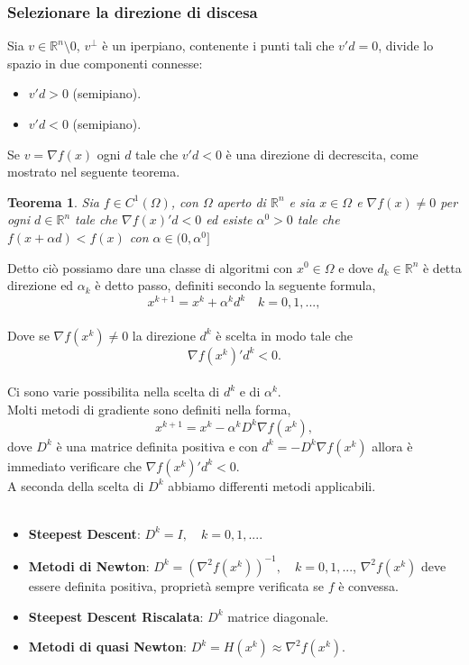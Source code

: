 \documentclass[a4paper, 12pt]{article}
\newtheorem{theorem}{Teorema}
\begin{document}
\subsubsection{Selezionare la direzione di discesa}
Sia $v \in \mathbb{R}^n \setminus 0$, $v^\perp$ è un iperpiano, contenente i punti tali che $v'd = 0$, divide lo spazio in due componenti connesse:
\begin{itemize}
  \item $v'd > 0$ (semipiano).
  \item $v'd < 0$ (semipiano).
\end{itemize}
Se $v = \nabla f(x)$ ogni $d$ tale che $v'd < 0$ è una direzione di decrescita, come mostrato nel seguente teorema.
\begin{theorem}
Sia $f \in C^1(\Omega)$, con $\Omega$ aperto di $\mathbb{R}^n$ e sia $x \in \Omega$ e $\nabla f(x) \neq 0$ per ogni $d \in \mathbb{R}^n$ tale che $\nabla f(x)'d < 0$ ed esiste $\alpha^0 > 0$ tale che $f(x + \alpha d) < f(x)$ con $\alpha \in (0, \alpha^0]$
\end{theorem}
Detto ciò possiamo dare una classe di algoritmi con $x^0 \in \Omega$ e dove $d_k \in \mathbb{R}^n$ è detta direzione ed $\alpha_k$ è detto passo, definiti secondo la seguente formula,\\
\[x^{k+1} = x^k + \alpha^k d^k \quad k=0, 1, ... ,\]\\
Dove se $\nabla f(x^k) \neq 0$ la direzione $d^k$ è scelta in modo tale che\\
\[\nabla f(x^k)'d^k < 0.\]\\
Ci sono varie possibilita nella scelta di $d^k$ e di $\alpha^k$.\\
Molti metodi di gradiente sono definiti nella forma,
\[x^{k+1} = x^k - \alpha^k D^k \nabla f(x^k),\]
dove $D^k$ è una matrice definita positiva e con $d^k = -D^k\nabla f(x^k)$ allora è immediato verificare che $\nabla f(x^k)'d^k < 0$.\\
A seconda della scelta di $D^k$ abbiamo differenti metodi applicabili.\\\\
\begin{itemize}
    \item \textbf{Steepest Descent}: $D^k = I, \quad k = 0, 1, ...$.
    \item \textbf{Metodi di Newton}: $D^k = (\nabla^2 f(x^k))^{-1}, \quad k = 0, 1, ...$, $\nabla^2 f(x^k)$ deve essere definita positiva, proprietà sempre verificata se $f$ è convessa.
    \item \textbf{Steepest Descent Riscalata}: $D^k$ matrice diagonale.
    \item \textbf{Metodi di quasi Newton}: $D^k = H(x^k) \approx \nabla^2 f(x^k)$.
\end{itemize}
\end{document}
